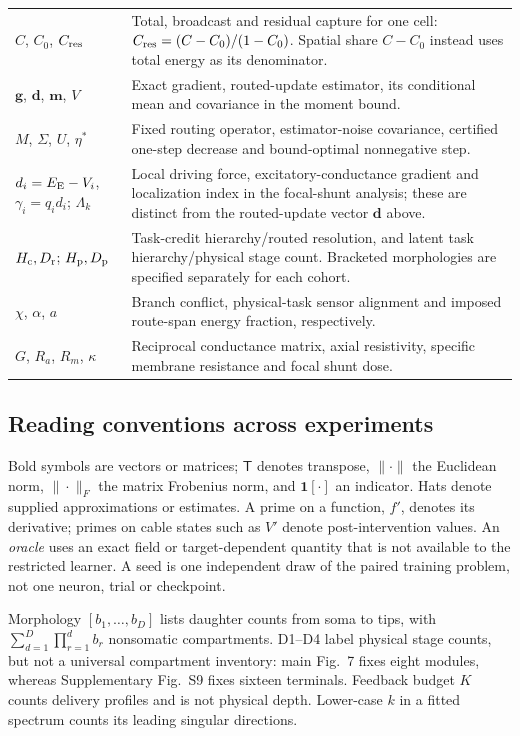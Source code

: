 \begin{table}[!htbp]
\begin{tabularx}{\textwidth}{p{}X}
$C$, $C_0$, $C_{\rm res}$ & Total, broadcast and residual capture for one cell: $C_{\rm res}=(C-C_0)/(1-C_0)$. Spatial share $C-C_0$ instead uses total energy as its denominator. \\
$\bm g$, $\bm d$, $\bm m$, $V$ & Exact gradient, routed-update estimator, its conditional mean and covariance in the moment bound. \\
$M$, $\Sigma$, $U$, $\eta^*$ & Fixed routing operator, estimator-noise covariance, certified one-step decrease and bound-optimal nonnegative step. \\
$d_i=E_{\rm E}-V_i$, $\gamma_i=q_id_i$; $\Lambda_k$ & Local driving force, excitatory-conductance gradient and localization index in the focal-shunt analysis; these are distinct from the routed-update vector $\bm d$ above. \\
$H_{\rm c},D_{\rm r}$; $H_{\rm p},D_{\rm p}$ & Task-credit hierarchy/routed resolution, and latent task hierarchy/physical stage count. Bracketed morphologies are specified separately for each cohort. \\
$\chi$, $\alpha$, $a$ & Branch conflict, physical-task sensor alignment and imposed route-span energy fraction, respectively. \\
$G$, $R_a$, $R_m$, $\kappa$ & Reciprocal conductance matrix, axial resistivity, specific membrane resistance and focal shunt dose. \\
\bottomrule
\end{tabularx}
\end{table}

\subsection*{Reading conventions across experiments}

Bold symbols are vectors or matrices; $\mathsf T$ denotes transpose,
$\|\cdot\|$ the Euclidean norm, $\|\cdot\|_F$ the matrix Frobenius norm,
and $\mathbf1[\cdot]$ an indicator. Hats denote supplied approximations or
estimates. A prime on a function, $f'$, denotes its derivative; primes on
cable states such as $V'$ denote post-intervention values.
An \emph{oracle} uses an exact field or target-dependent quantity that is
not available to the restricted learner. A seed is one independent draw of
the paired training problem, not one neuron, trial or checkpoint.

Morphology $[b_1,\ldots,b_D]$ lists daughter counts from soma to tips, with
$\sum_{d=1}^D\prod_{r=1}^db_r$ nonsomatic compartments. D1--D4 label physical
stage counts, but not a universal compartment inventory: main Fig.~7 fixes
eight modules, whereas Supplementary Fig.~S9 fixes sixteen terminals.
Feedback budget $K$ counts delivery profiles and is not physical depth.
Lower-case $k$ in a fitted spectrum counts its leading singular directions.

